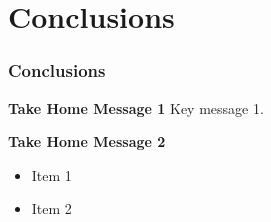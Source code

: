 
\section[Conclusions]{Conclusions}


\begin{frame}
    \frametitle{Conclusions}
    \begin{block}{\centering \textbf{Take Home Message 1}}
        \centering \small{Key message 1.}
    \end{block}
    
    \begin{block}{\centering \textbf{Take Home Message 2}}
        \centering 
        \begin{itemize}
            \item \small{Item 1} 
            \item \small{Item 2}
        \end{itemize}
    \end{block}
     
\end{frame}

